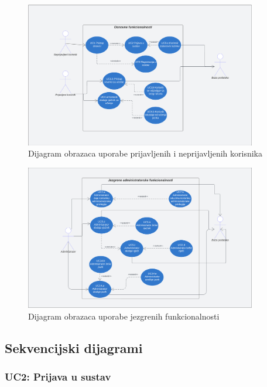 				\begin{figure}[H]
					\includegraphics[width=0.9\textwidth]{dijagrami/Prijava.png} 
					\centering
					\caption{Dijagram obrazaca uporabe prijavljenih i neprijavljenih korisnika}
					\label{fig:class_diagram}
				\end{figure}
				
				\begin{figure}[H]
					\includegraphics[width=0.9\textwidth]{dijagrami/Jezgrene.png} 
					\centering
					\caption{Dijagram obrazaca uporabe jezgrenih funkcionalnosti} 
					\label{fig:class_diagram}
				\end{figure}
				\eject
				
				


			\subsection{Sekvencijski dijagrami}
					\subsubsection{UC2: Prijava u sustav}

